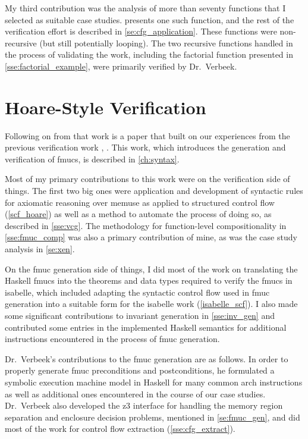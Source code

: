 My third contribution was the analysis of more than seventy functions that I selected as suitable case studies.
 presents one such function,
and the rest of the verification effort is described in \cref{se:cfg_application}.
These functions were non-recursive (but still potentially looping).
The two recursive functions handled in the process of validating the work,
including the factorial function presented in \cref{sse:factorial_example},
were primarily verified by Dr.~Verbeek.

\section*{Hoare-Style Verification}
\label{attribute2}
Following on from that work is a paper that built on our experiences from the previous verification work \autocite{verbeek2020automated}, .
This work, which introduces the generation and verification of \acp{fmuc}, is described in \cref{ch:syntax}.

Most of my primary contributions to this work were on the verification side of things.
The first two big ones were application and development of syntactic rules
for axiomatic reasoning over \gls{memuse}
as applied to structured control flow (\cref{scf_hoare})
as well as a method to automate the process of doing so, 
as described in \cref{sse:vcg}.
The methodology for function-level compositionality in \cref{sse:fmuc_comp}
was also a primary contribution of mine,
as was the case study analysis in \cref{se:xen}.

On the \ac{fmuc} generation side of things,
I did most of the work on translating the Haskell \acp{fmuc}
into the theorems and data types required to verify the \acp{fmuc} in \gls{isabelle},
which included adapting the syntactic control flow used in \ac{fmuc} generation
into a suitable form for the \gls{isabelle} work (\cref{isabelle_scf}).
I also made some significant contributions to invariant generation in \cref{sse:inv_gen} and contributed some entries in the implemented Haskell semantics for additional instructions encountered in the process of \ac{fmuc} generation.

Dr.~Verbeek's contributions to the \ac{fmuc} generation are as follows.
In order to properly generate \ac{fmuc} preconditions and postconditions,
he formulated a symbolic execution machine model in Haskell for many common \gls{arch} instructions as well as additional ones encountered in the course of our case studies.
Dr.~Verbeek also developed the \gls{z3} \autocite{de2008z3} interface
for handling the memory region separation and enclosure decision problems,
mentioned in \cref{se:fmuc_gen},
and did most of the work for control flow extraction (\cref{sse:cfg_extract}).

